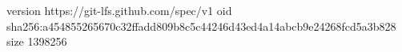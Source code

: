 version https://git-lfs.github.com/spec/v1
oid sha256:a454855265670c32ffadd809b8c5c44246d43ed4a14abcb9e24268fcd5a3b828
size 1398256

